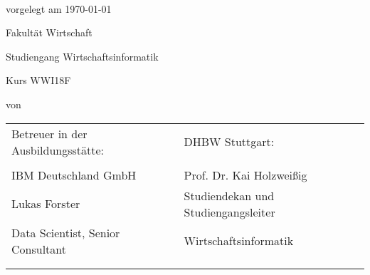 \begin{spacing}{1}
\begin{center}	
~\vspace{0mm}

{\sffamily
    \LARGE  
    \textbf{\themaMeinerArbeit}
    
    \bigskip
    \textbf{\unterThemaMeinerArbeit}
}

\vspace{15mm}

{\Large \typMeinerArbeit}

\vspace{1cm}

vorgelegt am \today 

\vspace{15mm}

Fakultät Wirtschaft
\medskip

Studiengang Wirtschaftsinformatik
\medskip

Kurs WWI18F 

\vspace{10mm}

von

\vspace{10mm}

{\large\textsc{\meinName}}

\vspace{10mm}
\end{center}

\vfill

\begin{tabular}{ll}
Betreuer in der Ausbildungsstätte: & DHBW Stuttgart: \\
\hspace{0.4\linewidth} & \\
IBM Deutschland GmbH &  Prof. Dr. Kai Holzweißig \\
Lukas Forster & Studiendekan und Studiengangsleiter\\
Data Scientist, Senior Consultant & Wirtschaftsinformatik\\
\\
\\
\end{tabular}


\vspace{1cm}
\end{spacing}

